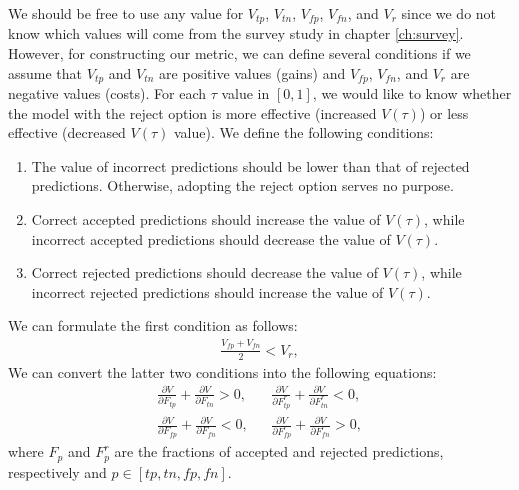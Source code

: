 %
We should be free to use any value for $V_{tp}$, $V_{tn}$, $V_{fp}$, $V_{fn}$, and $V_r$ since we do not know which values will come from the survey study in chapter \ref{ch:survey}.
%
However, for constructing our metric, we can define several conditions if we assume that $V_{tp}$ and $V_{tn}$ are positive values (gains) and $V_{fp}$, $V_{fn}$, and $V_{r}$ are negative values (costs).
%
For each $\tau$ value in $[0, 1]$, we would like to know whether the model with the reject option is more effective (increased $V(\tau)$) or less effective (decreased $V(\tau)$ value).
%
We define the following conditions:
\begin{enumerate}
    \item The value of incorrect predictions should be lower than that of rejected predictions. Otherwise, adopting the reject option serves no purpose.
    \item Correct accepted predictions should increase the value of $V(\tau)$, while incorrect accepted predictions should decrease the value of $V(\tau)$.
    \item Correct rejected predictions should decrease the value of $V(\tau)$, while incorrect rejected predictions should increase the value of $V(\tau)$.
\end{enumerate}
%
We can formulate the first condition as follows:
% 
\begin{align}
    \label{for:value-condition}
    \frac{V_{fp} + V_{fn}}{2} < V_r,
\end{align}
%
We can convert the latter two conditions into the following equations:
\begin{subequations}
    \label{for:conditions}
    \begin{align}
        \frac{\partial V}{\partial F_{tp}} + \frac{\partial V}{\partial F_{tn}} > 0, &  &
        \frac{\partial V}{\partial F^r_{tp}} + \frac{\partial V}{\partial F^r_{tn}} < 0, \label{for:conditions-tp-tn} \\
        \frac{\partial V}{\partial F_{fp}} + \frac{\partial V}{\partial F_{fn}} < 0, &  &
        \frac{\partial V}{\partial F^r_{fp}} + \frac{\partial V}{\partial F^r_{fn}} > 0, \label{for:conditions-fp-fn}
    \end{align}
\end{subequations}
%
where $F_p$ and $F_p^r$ are the fractions of accepted and rejected predictions, respectively and $p \in [tp, tn, fp, fn]$.
%
